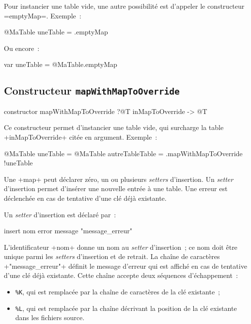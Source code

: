 Pour instancier une table vide, une autre possibilité est d'appeler le constructeur \ggst=emptyMap=. Exemple~:
\begin{galgas3}
@MaTable uneTable = .emptyMap
\end{galgas3}

Ou encore~:

\begin{galgas3}
var uneTable = @MaTable.emptyMap
\end{galgas3}




\subsection{Constructeur \texttt{mapWithMapToOverride}}

\begin{galgas3}
constructor mapWithMapToOverride ?@T inMapToOverride -> @T
\end{galgas3}

Ce constructeur permet d'instancier une table vide, qui surcharge la table \ggst+inMapToOverride+ citée en argument. Exemple~:
\begin{galgas3}
@MaTable uneTable = {}
@MaTable autreTableTable = .mapWithMapToOverride {!uneTable}
\end{galgas3}







Une \ggst+map+ peut déclarer zéro, un ou plusieurs \emph{setters} d'insertion. Un \emph{setter} d'insertion permet d'insérer une nouvelle entrée à une table. Une erreur est déclenchée en cas de tentative d'une clé déjà existante.


Un \emph{setter} d'insertion est déclaré par~:

\begin{galgas3}
insert nom error message "message_erreur"
\end{galgas3}

\begin{galgas4}
\end{galgas4}

L'identificateur \ggst+nom+ donne un nom au \emph{setter} d'insertion~; ce nom doit être unique parmi les \emph{setters} d'insertion et de retrait. La chaîne de caractères \ggst+"message_erreur"+ définit le message d'erreur qui est affiché en cas de tentative d'une clé déjà existante. Cette chaîne accepte deux séquences d'échappement~:
\begin{itemize}
  \item \texttt{\%K}, qui est remplacée par la chaîne de caractères de la clé existante~;
  \item \texttt{\%L}, qui est remplacée par la chaîne décrivant la position de la clé existante dans les fichiers source.
\end{itemize}


